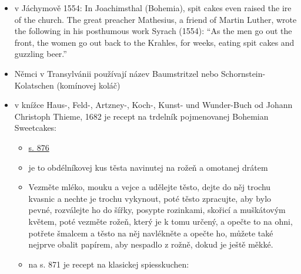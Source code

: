 \begin{itemize}
\begin{itemize}
    \begin{itemize}
    \tightlist
    \item
      Co se rozumělo pod „pohanským nebo českým`` těstem, resp. koláčem,
      je patrné z o 100 let staršího würzburského pergamenového
      rukopisu. Podle něj se do těsta přidával med, vejce, pepř,
      „koření`` a mandle. Barevná těsta byla tehdy velmi oblíbená a
      uvádějí se odpovídající pokyny pro barvení. Šafrán pro žlutou,
      špenátová šťáva pro zelenou, chrpa pro modrou a další.
    \end{itemize}
  \item
    v Jáchymově 1554: In Joachimsthal (Bohemia), spit cakes even raised
    the ire of the church. The great preacher Mathesius, a friend of
    Martin Luther, wrote the following in his posthumous work Syrach
    (1554): ``As the men go out the front, the women go out back to the
    Krahles, for weeks, eating spit cakes and guzzling beer.''
  \item
    Němci v Transylvánii používají název Baumstritzel nebo
    Schornstein-Kolatschen (komínovej koláč)
  \item
    v knížce Haus-, Feld-, Artzney-, Koch-, Kunst- und Wunder-Buch od
    Johann Christoph Thieme, 1682 je recept na trdelník pojmenovanej
    Bohemian Sweetcakes:

    \begin{itemize}
    \tightlist
    \item
      \href{https://books.google.cz/books?id=PytAAAAAcAAJ&pg=PA1604&hl=cs&source=gbs_selected_pages&cad=1\#v=onepage&q=bohmisch&f=false}{s.
      876}
    \item
      je to obdélníkovej kus těsta navinutej na rožeň a omotanej drátem
    \item
      Vezměte mléko, mouku a vejce a udělejte těsto, dejte do něj trochu
      kvasnic a nechte je trochu vykynout, poté těsto zpracujte, aby
      bylo pevné, rozválejte ho do šířky, posypte rozinkami, skořicí a
      muškátovým květem, poté vezměte rožeň, který je k tomu určený, a
      opečte to na ohni, potřete šmalcem a těsto na něj navlékněte a
      opečte ho, můžete také nejprve obalit papírem, aby nespadlo z
      rožně, dokud je ještě měkké.
    \item
      na s. 871 je recept na klasickej spiesskuchen:


\end{itemize}
\end{itemize}
\end{itemize}
